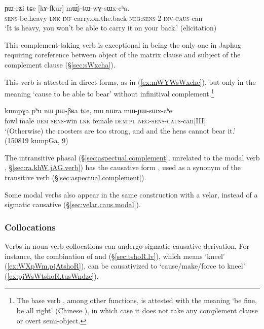 \begin{exe}
\ex \label{ex:mWjtWwGsWxcha}
\gll ɲɯ-rʑi tɕe [kɤ-fkur] mɯ́j-tɯ-wɣ-sɯx-cʰa. \\
\textsc{sens}-be.heavy \textsc{lnk}  \textsc{inf}-carry.on.the.back \textsc{neg}:\textsc{sens}-\textsc{2}-\textsc{inv}-\textsc{caus}-can \\
\glt `It is heavy, you won't be able to carry it on your back.' (elicitation)
\end{exe}	

 This complement-taking verb is exceptional in being the only one in Japhug requiring coreference between object of the matrix clause and subject of the complement clause (§\ref{sec:sWxcha}).

This verb is attested in direct forms, as in (\ref{ex:mWYWsWxche}), but only in the meaning `cause to be able to bear' without infinitival complement.\footnote{The base verb , among other functions, is attested with the meaning `be fine, be all right' (Chinese ), in which case it does not take any complement clause or overt semi-object. }

\begin{exe}
\ex \label{ex:mWYWsWxche}
\gll kumpɣa pʰu nɯ ɲɯ-βʁa tɕe, mu nɯra mɯ-ɲɯ-sɯx-cʰe\\
fowl male \textsc{dem} \textsc{sens}-win \textsc{lnk} female \textsc{dem}:\textsc{pl} \textsc{neg}-\textsc{sens}-\textsc{caus}-can[III] \\
\glt `(Otherwise) the roosters are too strong, and and the hens cannot bear it.' (150819 kumpGa, 9)
\end{exe} 

The intransitive phasal  (§\ref{sec:aspectual.complement}, unrelated to the modal verb , §\ref{sec:ra.khW.jAG.verb}) has the causative form , used as a synonym of the transitive verb  (§\ref{sec:aspectual.complement}).

Some modal verbs also appear in the same construction with a velar, instead of a sigmatic causative (§\ref{sec:velar.caus.modal}).

\subsubsection{Collocations} \label{sec:sig.caus.collocations}
Verbs in noun-verb collocations can undergo sigmatic causative derivation. For instance, the combination of  and  (§\ref{sec:tshoR.lv}), which means `kneel' (\ref{ex:WXpWm.pjAtshoR}), can be causativized to  `cause/make/force to kneel' (\ref{ex:pjWsWtshoR.tusWndze}).

